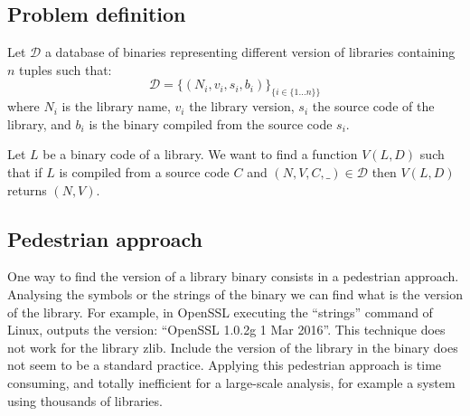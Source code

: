 \documentclass{article}
\begin{document}
   \subsection{Problem definition}

   Let $\mathcal{D}$ a database of binaries representing different version of libraries containing $n$ tuples such that:
    \[ \mathcal{D} = \{ (N_i, v_i, s_i, b_i) \}_{\{i \in \{1 \dots n\}\}}  \]
    where $N_i$ is the library name, $v_i$ the library version, $s_i$ the source
    code of the library, and $b_i$ is the binary compiled from the source code $s_i$. 

    Let $L$ be a binary code of a library. We want to find a function $V(L,D)$ such that if $L$ is compiled from a source code $C$ and $(N, V, C, \_) \in \mathcal{D}$ then $V(L,D)$ returns $(N,V)$.

	\subsection{Pedestrian approach}
    
	    One way to find the version of a library binary consists in a pedestrian approach. Analysing the symbols or the strings of the binary we can find what is the version of the library. For example, in OpenSSL executing the ``strings'' command of Linux, outputs the version: ``OpenSSL 1.0.2g  1 Mar 2016''. This technique does not work for the library zlib. Include the version of the library in the binary does not seem to be a standard practice.
	Applying this pedestrian approach is time consuming, and totally inefficient for a large-scale analysis, for example a system using thousands of libraries.
	   
	        

    
\end{document}
